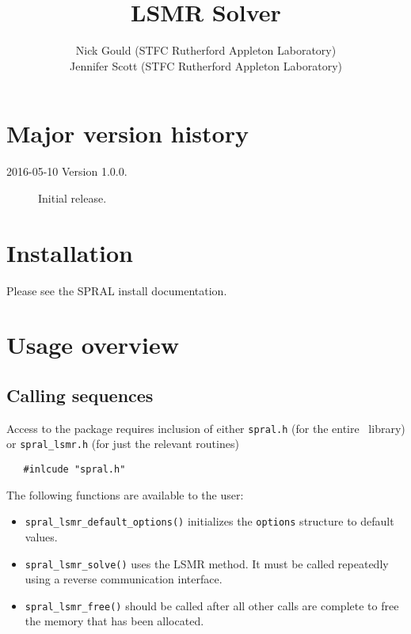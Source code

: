 \title{LSMR Solver}
\author{
   Nick Gould (STFC Rutherford Appleton Laboratory) \\
   Jennifer Scott (STFC Rutherford Appleton Laboratory)
}
\spralmaketitle
\thispagestyle{firststyle}

\newpage
\section*{Major version history}
\begin{description}
\item[2016-05-10 Version 1.0.0.] Initial release.
\end{description}


\section{Installation}
Please see the SPRAL install documentation. 


\section{Usage overview}

\subsection{Calling sequences}

Access to the package requires inclusion of either \texttt{spral.h} (for the
entire \spral\ library) or \texttt{spral\_lsmr.h} (for just the relevant routines)

\begin{verbatim}
   #inlcude "spral.h"
\end{verbatim}

\medskip

\noindent
The following functions are available to the user:
\begin{itemize}
\item {\tt spral\_lsmr\_default\_options()} initializes the \texttt{options}
   structure to default values.
\item {\tt spral\_lsmr\_solve()} uses the LSMR method. It must be called repeatedly
   using a reverse communication interface.
\item {\tt spral\_lsmr\_free()} should be called after all other calls are
   complete to free the memory that has been allocated. 
\end{itemize}


